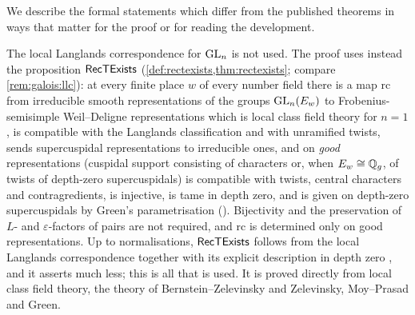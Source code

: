 We describe the formal statements which differ from the published theorems in ways that matter
for the proof or for reading the development.

  The local Langlands correspondence for $\operatorname{GL}_n$
\cite{HarrisTaylor2001,Henniart2000,Scholze2013} is not used.  The proof uses instead the proposition
$\mathsf{RecTExists}$ (\cref{def:rectexists,thm:rectexists}; compare \cref{rem:galois:llc}): at every
finite place $w$ of every number field
there is a map $\mathrm{rc}$ from irreducible smooth representations of the groups $\operatorname{GL}_n(E_w)$ to
Frobenius-semisimple Weil--Deligne representations which is local class field theory for $n=1$, is
compatible with the Langlands classification and with unramified twists, sends supercuspidal
representations to irreducible ones, and on \emph{good} representations (cuspidal support consisting
of characters or, when $E_w\cong\mathbb{Q}_g$, of twists of depth-zero supercuspidals) is compatible with
twists, central characters and contragredients, is injective, is tame in depth zero, and is given on
depth-zero supercuspidals by Green's parametrisation ().  Bijectivity and
the preservation of $L$- and $\varepsilon$-factors of pairs are not required, and $\mathrm{rc}$ is
determined only on good representations.  Up to normalisations, $\mathsf{RecTExists}$ follows from
the local Langlands correspondence together with its explicit description in depth zero
\cite{BushnellHenniart2005}, and it asserts much less; this is all that is used.  It is proved
directly from local class field theory, the theory of Bernstein--Zelevinsky and Zelevinsky,
Moy--Prasad and Green.  

